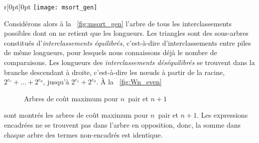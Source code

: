 \begin{wrapfigure}[9]{r}[0pt]{0pt}
\centering
\texttt{[image: msort\_gen]}%
\caption{\(\sum_{j=0}^{r}2^{e_j}\) clés}
\label{fig:msort_gen}
\end{wrapfigure}
Considérons alors à la \fig~\ref{fig:msort_gen} l'arbre de tous les
interclassements possibles
dont on ne retient que les longueurs. Les triangles sont des
sous-arbres constitués d'\emph{interclassements équilibrés},
c'est-à-dire d'interclassements entre piles de même longueurs, pour
lesquels nous connaissons déjà le nombre de comparaisons. Les
longueurs des \emph{interclassements déséquilibrés} se trouvent dans
la branche descendant à droite, c'est-à-dire les n{\oe}uds à partir de
la racine, \(2^{e_r}+ \dots + 2^{e_0}\), jusqu'à \(2^{e_1} +
2^{e_0}\). À la
\fig~\vref{fig:Wn_even}
\begin{figure}[b]
\centering
{} %
\qquad
{}
\caption{Arbres de coût maximum pour \(n\)~pair et \(n+1\)}
\label{fig:Wn_even}
\end{figure}
sont montrés les arbres de coût maximum pour \(n\)~pair et
\(n+1\). Les expressions encadrées ne se trouvent pas dans l'arbre en
opposition, donc, la somme dans chaque arbre des termes non-encadrés
est identique.
